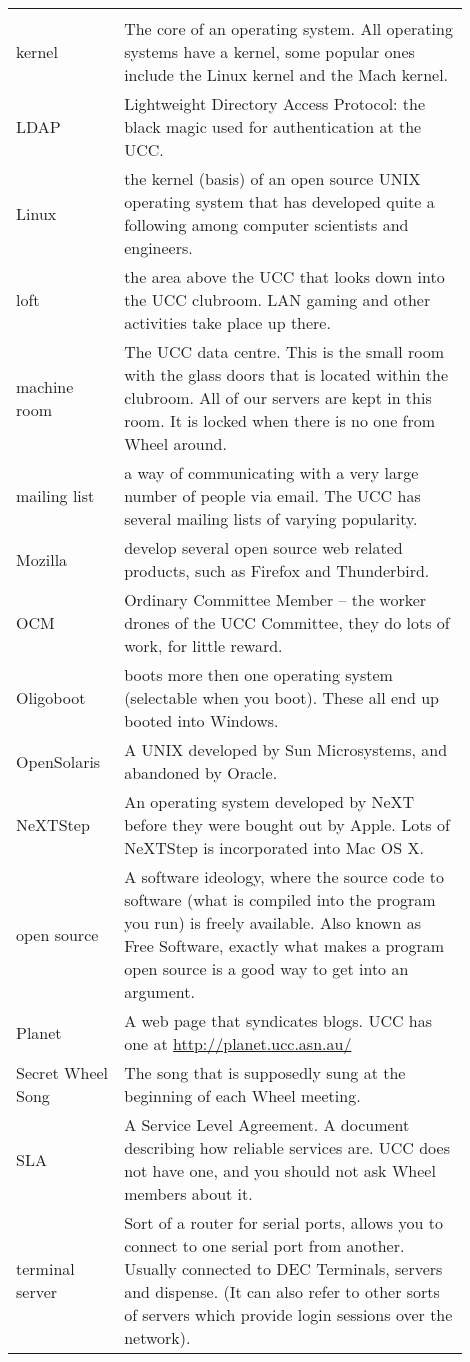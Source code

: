{\begin{tabular}{p{0.2\linewidth}|p{0.7\linewidth}}
	\rowcolor{black} \color{white}{Term} & \color{white}{Translation} \\
kernel &
The core of an operating system. All operating systems have a kernel, some popular ones include the Linux kernel and the Mach kernel. \\
LDAP &
Lightweight Directory Access Protocol: the black magic used for authentication at the UCC. \\
Linux &
the kernel (basis) of an open source UNIX operating system that has developed quite a following among computer scientists and engineers. \\
loft &
the area above the UCC that looks down into the UCC clubroom. LAN gaming and other activities take place up there. \\
machine room &
The UCC data centre. This is the small room with the glass doors that is located within the clubroom. All of our servers are kept in this room. It is locked when there is no one from Wheel around. \\
mailing list &
a way of communicating with a very large number of people via email. The UCC has several mailing lists of varying popularity. \\
Mozilla &
develop several open source web related products, such as Firefox and Thunderbird. \\
OCM &
Ordinary Committee Member -- the worker drones of the UCC Committee, they do lots of work, for little reward. \\
Oligoboot &
boots more then one operating system (selectable when you boot). These all end up booted into Windows. \\
OpenSolaris &
A UNIX developed by Sun Microsystems, and abandoned by Oracle. \\
NeXTStep &
An operating system developed by NeXT before they were bought out by Apple. Lots of NeXTStep is incorporated into Mac OS X. \\
open source &
A software ideology, where the source code to software (what is compiled into the program you run) is freely available. Also known as Free Software, exactly what makes a program open source is a good way to get into an argument. \\
Planet &
A web page that syndicates blogs. UCC has one at \url{http://planet.ucc.asn.au/} \\
Secret Wheel Song &
The song that is supposedly sung at the beginning of each Wheel meeting. \\ %
SLA &
A Service Level Agreement. A document describing how reliable services are. UCC does not have one, and you should not ask Wheel members about it. \\
terminal server &
Sort of a router for serial ports, allows you to connect to one serial port from another. Usually connected to DEC Terminals, servers and dispense. (It can also refer to other sorts of servers which provide login sessions over the network). \\
\end{tabular}


}
